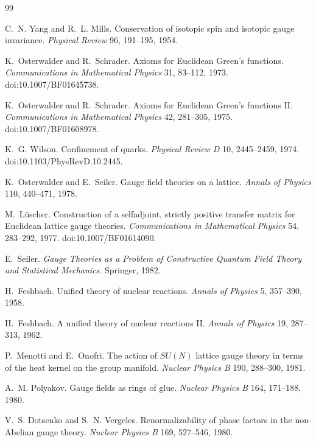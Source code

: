 \documentclass[11pt]{article}
\begin{document}
\begin{thebibliography}{99}

C.~N. Yang and R.~L. Mills.
\newblock Conservation of isotopic spin and isotopic gauge invariance.
\newblock \emph{Physical Review} 96, 191--195, 1954.

K.~Osterwalder and R.~Schrader.
\newblock Axioms for Euclidean Green's functions.
\newblock \emph{Communications in Mathematical Physics} 31, 83--112, 1973.
\newblock doi:10.1007/BF01645738.

K.~Osterwalder and R.~Schrader.
\newblock Axioms for Euclidean Green's functions II.
\newblock \emph{Communications in Mathematical Physics} 42, 281--305, 1975.
\newblock doi:10.1007/BF01608978.

K.~G. Wilson.
\newblock Confinement of quarks.
\newblock \emph{Physical Review D} 10, 2445--2459, 1974.
\newblock doi:10.1103/PhysRevD.10.2445.

K.~Osterwalder and E.~Seiler.
\newblock Gauge field theories on a lattice.
\newblock \emph{Annals of Physics} 110, 440--471, 1978.

M.~L\"uscher.
\newblock Construction of a selfadjoint, strictly positive transfer matrix for Euclidean lattice gauge theories.
\newblock \emph{Communications in Mathematical Physics} 54, 283--292, 1977.
\newblock doi:10.1007/BF01614090.

E.~Seiler.
\newblock \emph{Gauge Theories as a Problem of Constructive Quantum Field Theory and Statistical Mechanics}.
\newblock Springer, 1982.

H.~Feshbach.
\newblock Unified theory of nuclear reactions.
\newblock \emph{Annals of Physics} 5, 357--390, 1958.

H.~Feshbach.
\newblock A unified theory of nuclear reactions II.
\newblock \emph{Annals of Physics} 19, 287--313, 1962.

P.~Menotti and E.~Onofri.
\newblock The action of \(SU(N)\) lattice gauge theory in terms of the heat kernel on the group manifold.
\newblock \emph{Nuclear Physics B} 190, 288--300, 1981.

A.~M. Polyakov.
\newblock Gauge fields as rings of glue.
\newblock \emph{Nuclear Physics B} 164, 171--188, 1980.

V.~S. Dotsenko and S.~N. Vergeles.
\newblock Renormalizability of phase factors in the non-Abelian gauge theory.
\newblock \emph{Nuclear Physics B} 169, 527--546, 1980.


\end{thebibliography}
\end{document}
